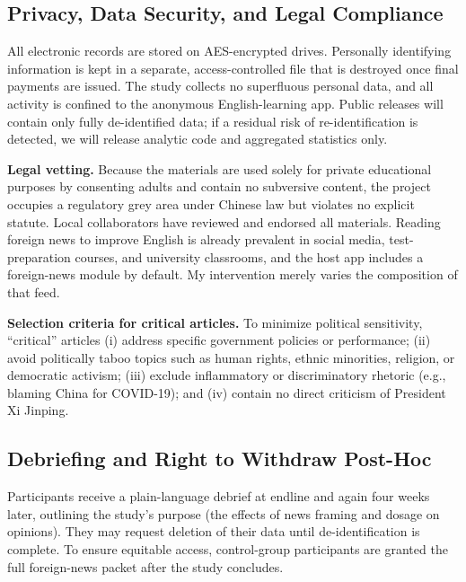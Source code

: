 \documentclass[12pt, american]{article}
\begin{document}
\subsection{Privacy, Data Security, and Legal Compliance}
All electronic records are stored on AES-encrypted drives.  Personally identifying information is kept in a separate, access-controlled file that is destroyed once final payments are issued.   The study collects no superfluous personal data, and all activity is confined to the anonymous English-learning app.  Public releases will contain only fully de-identified data; if a residual risk of re-identification is detected, we will release analytic code and aggregated statistics only.

\textbf{Legal vetting.}  
Because the materials are used solely for private educational purposes by consenting adults and contain no subversive content, the project occupies a regulatory grey area under Chinese law but violates no explicit statute.  Local collaborators have reviewed and endorsed all materials.  Reading foreign news to improve English is already prevalent in social media, test-preparation courses, and university classrooms, and the host app includes a foreign-news module by default.  My intervention merely varies the composition of that feed.

\textbf{Selection criteria for critical articles.}  
To minimize political sensitivity, “critical” articles (i) address specific government policies or performance; (ii) avoid politically taboo topics such as human rights, ethnic minorities, religion, or democratic activism; (iii) exclude inflammatory or discriminatory rhetoric (e.g., blaming China for COVID-19); and (iv) contain no direct criticism of President Xi Jinping.

\subsection{Debriefing and Right to Withdraw Post-Hoc}
Participants receive a plain-language debrief at endline and again four weeks later, outlining the study’s purpose (the effects of news framing and dosage on opinions).  They may request deletion of their data until de-identification is complete.  To ensure equitable access, control-group participants are granted the full foreign-news packet after the study concludes.
\end{document}

